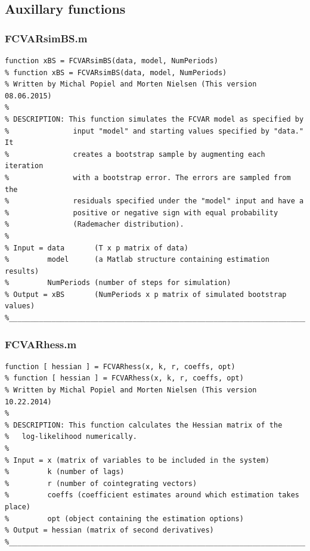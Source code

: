 \documentclass[10pt]{article}
\begin{document}
\subsection{Auxillary functions}

\subsubsection{FCVARsimBS.m}
\begin{lstlisting}[frame=single,caption={FCVARsim.m}]
function xBS = FCVARsimBS(data, model, NumPeriods)
% function xBS = FCVARsimBS(data, model, NumPeriods)
% Written by Michal Popiel and Morten Nielsen (This version 08.06.2015)
% 
% DESCRIPTION: This function simulates the FCVAR model as specified by
%               input "model" and starting values specified by "data." It
%               creates a bootstrap sample by augmenting each iteration
%               with a bootstrap error. The errors are sampled from the
%               residuals specified under the "model" input and have a
%               positive or negative sign with equal probability
%               (Rademacher distribution). 
%
% Input = data       (T x p matrix of data)
%         model      (a Matlab structure containing estimation results)
%         NumPeriods (number of steps for simulation)
% Output = xBS       (NumPeriods x p matrix of simulated bootstrap values)
%_________________________________________________________________________
\end{lstlisting}


\subsubsection{FCVARhess.m}
\begin{lstlisting}[frame=single,caption={FCVARhess.m}]
function [ hessian ] = FCVARhess(x, k, r, coeffs, opt)
% function [ hessian ] = FCVARhess(x, k, r, coeffs, opt)
% Written by Michal Popiel and Morten Nielsen (This version 10.22.2014)
% 
% DESCRIPTION: This function calculates the Hessian matrix of the
% 	log-likelihood numerically.
%
% Input = x (matrix of variables to be included in the system)
%         k (number of lags)
%         r (number of cointegrating vectors)
%         coeffs (coefficient estimates around which estimation takes place)
%         opt (object containing the estimation options)
% Output = hessian (matrix of second derivatives)
%_________________________________________________________________________
\end{lstlisting}
\end{document}
